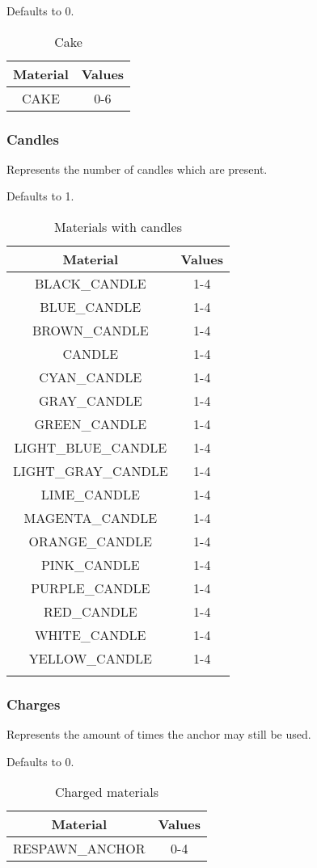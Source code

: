 Defaults to 0.

\begin{table}[H]
	\centering
	\begin{tabular}{ |c|c| }
		\hline
		Material & Values \\
		\hline
		CAKE & 0-6 \\
		\hline
	\end{tabular}
	\caption{Cake}
\end{table}

\subsubsection{Candles}
Represents the number of candles which are present.

Defaults to 1.

\begin{longtable}{ |c|c| }
	\hline
	Material & Values \\
	\hline
	\endhead
	BLACK\_CANDLE & 1-4 \\
	BLUE\_CANDLE & 1-4 \\
	BROWN\_CANDLE & 1-4 \\
	CANDLE & 1-4 \\
	CYAN\_CANDLE & 1-4 \\
	GRAY\_CANDLE & 1-4 \\
	GREEN\_CANDLE & 1-4 \\
	LIGHT\_BLUE\_CANDLE & 1-4 \\
	LIGHT\_GRAY\_CANDLE & 1-4 \\
	LIME\_CANDLE & 1-4 \\
	MAGENTA\_CANDLE & 1-4 \\
	ORANGE\_CANDLE & 1-4 \\
	PINK\_CANDLE & 1-4 \\
	PURPLE\_CANDLE & 1-4 \\
	RED\_CANDLE & 1-4 \\
	WHITE\_CANDLE & 1-4 \\
	YELLOW\_CANDLE & 1-4 \\
	\hline
	\caption{Materials with candles}
\end{longtable}

\subsubsection{Charges}
Represents the amount of times the anchor may still be used.

Defaults to 0.

\begin{table}[H]
	\centering
	\begin{tabular}{ |c|c| }
		\hline
		Material & Values \\
		\hline
		RESPAWN\_ANCHOR & 0-4 \\
		\hline
	\end{tabular}
	\caption{Charged materials}
\end{table}

